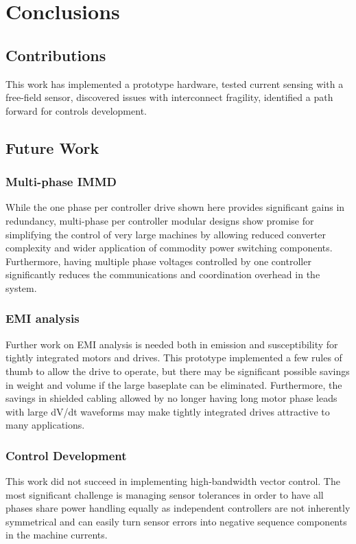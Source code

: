 \chapter{Conclusions}

\section{Contributions}
This work has implemented a prototype hardware, tested current sensing with a
free-field sensor, discovered issues with interconnect fragility, identified a
path forward for controls development.

\section{Future Work}

\subsection{Multi-phase IMMD}
While the one phase per controller drive shown here provides significant gains
in redundancy, multi-phase per controller modular designs show promise for
simplifying the control of very large machines by allowing reduced converter
complexity and wider application of commodity power switching components.
Furthermore, having multiple phase voltages controlled by one controller
significantly reduces the communications and coordination overhead in the
system.


\subsection{EMI analysis}
Further work on EMI analysis is needed both in emission and susceptibility for
tightly integrated motors and drives.
This prototype implemented a few rules of thumb to allow the drive to operate,
but there may be significant possible savings in weight and volume if the
large baseplate can be eliminated.
Furthermore, the savings in shielded cabling allowed by no longer having long
motor phase leads with large dV/dt waveforms may make tightly integrated
drives attractive to many applications.

\subsection{Control Development}
This work did not succeed in implementing high-bandwidth vector control.
The most significant challenge is managing sensor tolerances in order to have
all phases share power handling equally as independent controllers are not
inherently symmetrical and can easily turn sensor errors into negative
sequence components in the machine currents.


